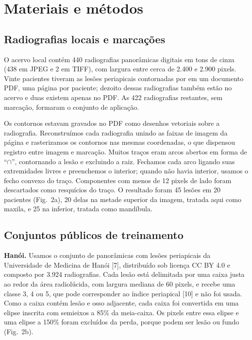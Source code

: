 \documentclass[twocolumn]{article}
\begin{document}

\section{Materiais e métodos}

\subsection{Radiografias locais e marcações}

O acervo local contém 440 radiografias panorâmicas digitais em tons de cinza (438 em JPEG e 2 em TIFF), com largura entre cerca de 2.400 e 2.900 pixels. Vinte pacientes tiveram as lesões periapicais contornadas por  em um documento PDF, uma página por paciente; dezoito dessas radiografias também estão no acervo e duas existem apenas no PDF. As 422 radiografias restantes, sem marcação, formaram o conjunto de aplicação.

Os contornos estavam gravados no PDF como desenhos vetoriais sobre a radiografia. Reconstruímos cada radiografia unindo as faixas de imagem da página e rasterizamos os contornos nas mesmas coordenadas, o que dispensou registro entre imagem e marcação. Muitos traços eram arcos abertos em forma de ``$\cap$'', contornando a lesão e excluindo a raiz. Fechamos cada arco ligando suas extremidades livres e preenchemos o interior; quando não havia interior, usamos o fecho convexo do traço. Componentes com menos de 12 pixels de lado foram descartados como resquícios do traço. O resultado foram 45 lesões em 20 pacientes (Fig.~2a), 20 delas na metade superior da imagem, tratada aqui como maxila, e 25 na inferior, tratada como mandíbula.

\subsection{Conjuntos públicos de treinamento}

\textbf{Hanói.} Usamos o conjunto de panorâmicas com lesões periapicais da Universidade de Medicina de Hanói [7], distribuído sob licença CC BY 4.0 e composto por 3.924 radiografias. Cada lesão está delimitada por uma caixa justa ao redor da área radiolúcida, com largura mediana de 60 pixels, e recebe uma classe 3, 4 ou 5, que pode corresponder ao índice periapical [10] e não foi usada. Como a caixa contém lesão e osso adjacente, cada caixa foi convertida em uma elipse inscrita com semieixos a 85\% da meia-caixa. Os pixels entre essa elipse e uma elipse a 150\% foram excluídos da perda, porque podem ser lesão ou fundo (Fig.~2b).
\end{document}

